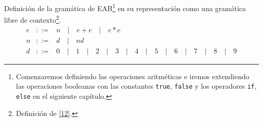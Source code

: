 \begin{definition}Definición de la gramática de \textsf{EAB}\footnote{Comenzaremos definiendo las operaciones aritméticas e iremos extendiendo las operaciones booleanas con las constantes \texttt{true}, \texttt{false} y los operadores \texttt{if}, \texttt{else} en el siguiente capítulo.} en su representación como una gramática libre de contexto\footnote{Definición de \hyperlink{12}{[12]}.}.
    \[
    \begin{array}{rll}
        e & ::= &  n\quad |\quad e + e\quad |\quad e*e\quad  \\
        n & ::= & d \quad |\quad nd \\
        d & ::= & 0 \quad |\quad 1 \quad |\quad 2 \quad |\quad 3 \quad |\quad 4 \quad |\quad 5 \quad |\quad 6 \quad |\quad 7 \quad |\quad 8 \quad |\quad 9 
    \end{array}
    \]

\end{definition}
    

     
